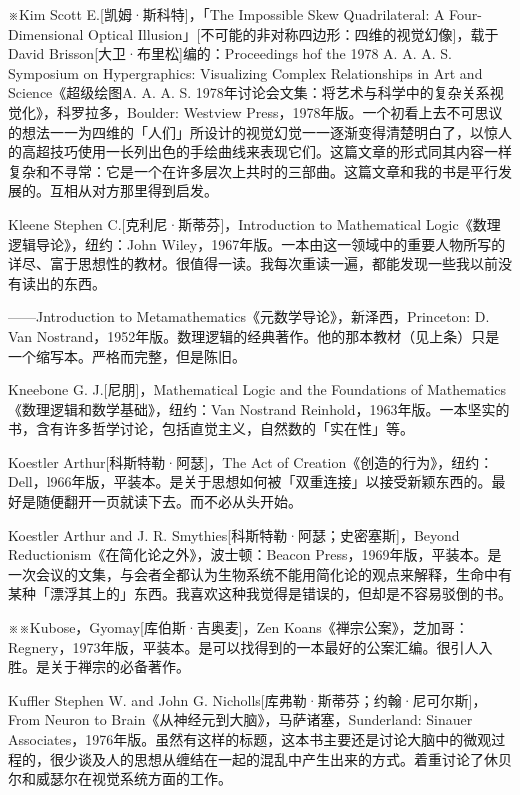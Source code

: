 \documentclass[
  12pt,
  twoside,
  openright,
  oldfontcommands,
]{memoir}
\begin{document}
※Kim Scott E.{[}凯姆·斯科特{]}，「The Impossible Skew Quadrilateral: A
Four-Dimensional Optical
Illusion」{[}不可能的非对称四边形：四维的视觉幻像{]}，载于David
Brisson{[}大卫·布里松{]}编的：Proceedings hof the 1978 A. A. A. S.
Symposium on Hypergraphics: Visualizing Complex Relationships in Art and
Science《超级绘图A. A. A. S.
1978年讨论会文集：将艺术与科学中的复杂关系视觉化》，科罗拉多，Boulder:
Westview
Press，1978年版。一个初看上去不可思议的想法一一为四维的「人们」所设计的视觉幻觉一一逐渐变得清楚明白了，以惊人的高超技巧使用一长列出色的手绘曲线来表现它们。这篇文章的形式同其内容一样复杂和不寻常：它是一个在许多层次上共时的三部曲。这篇文章和我的书是平行发展的。互相从对方那里得到启发。

Kleene Stephen C.{[}克利尼·斯蒂芬{]}，Introduction to Mathematical
Logic《数理逻辑导论》，纽约：John
Wiley，1967年版。一本由这一领域中的重要人物所写的详尽、富于思想性的教材。很值得一读。我每次重读一遍，都能发现一些我以前没有读出的东西。

------Jntroduction to Metamathematics《元数学导论》，新泽西，Princeton:
D. Van
Nostrand，1952年版。数理逻辑的经典著作。他的那本教材（见上条）只是一个缩写本。严格而完整，但是陈旧。

Kneebone G. J.{[}尼朋{]}，Mathematical Logic and the Foundations of
Mathematics《数理逻辑和数学基础》，纽约：Van Nostrand
Reinhold，1963年版。一本坚实的书，含有许多哲学讨论，包括直觉主义，自然数的「实在性」等。

Koestler Arthur{[}科斯特勒·阿瑟{]}，The Act of
Creation《创造的行为》，纽约：Dell，l966年版，平装本。是关于思想如何被「双重连接」以接受新颖东西的。最好是随便翻开一页就读下去。而不必从头开始。

Koestler Arthur and J. R. Smythies{[}科斯特勒·阿瑟；史密塞斯{]}，Beyond
Reductionism《在简化论之外》，波士顿：Beacon
Press，1969年版，平装本。是一次会议的文集，与会者全都认为生物系统不能用简化论的观点来解释，生命中有某种「漂浮其上的」东西。我喜欢这种我觉得是错误的，但却是不容易驳倒的书。

※※Kubose，Gyomay{[}库伯斯·吉奥麦{]}，Zen
Koans《禅宗公案》，芝加哥：Regnery，1973年版，平装本。是可以找得到的一本最好的公案汇编。很引人入胜。是关于禅宗的必备著作。

Kuffler Stephen W. and John G.
Nicholls{[}库弗勒·斯蒂芬；约翰·尼可尔斯{]}，From Neuron to
Brain《从神经元到大脑》，马萨诸塞，Sunderland: Sinauer
Associates，1976年版。虽然有这样的标题，这本书主要还是讨论大脑中的微观过程的，很少谈及人的思想从缠结在一起的混乱中产生出来的方式。着重讨论了休贝尔和威瑟尔在视觉系统方面的工作。
\end{document}
